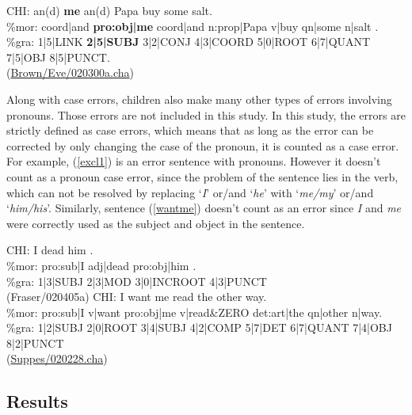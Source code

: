 \begin{exe}
\ex \label{conjoined} \gll *CHI: an(d) \textbf{me} an(d) Papa buy some salt.\\
\%mor: coord|and \textbf{pro:obj|me} coord|and n:prop|Papa v|buy qn|some n|salt .\\
\%gra: 1|5|LINK \textbf{2|5|SUBJ} 3|2|CONJ 4|3|COORD 5|0|ROOT 6|7|QUANT 7|5|OBJ 8|5|PUNCT.\\
(\href{https://childes.talkbank.org/browser/index.php?url=Eng-NA/Brown/Eve/020300a.cha}{Brown/Eve/020300a.cha})
\end{exe}
Along with case errors, children also make many other types of errors involving pronouns. Those errors are not included in this study. In this study, the errors are strictly defined as case errors, which means that as long as the error can be corrected by only changing the case of the pronoun, it is counted as a case error. For example, (\ref{excl1}) is an error sentence with pronouns. However it doesn't count as a pronoun case error, since the problem of the sentence lies in the verb, which can not be resolved by replacing `\textit{I}' or/and `\textit{he}' with `\textit{me/my}' or/and `\textit{him/his}'. Similarly, sentence (\ref{wantme}) doesn't count as an error since \textit{I} and \textit{me} were correctly used as the subject and object in the sentence. 
\begin{exe}
\ex \label{excl1} \gll *CHI:	I dead him .\\
\%mor:	pro:sub|I adj|dead pro:obj|him .\\
\%gra:	1|3|SUBJ 2|3|MOD 3|0|INCROOT 4|3|PUNCT\\ 
(Fraser/020405a)
\ex \label{wantme} \gll *CHI: I want me read the other way. \\
\%mor: pro:sub|I v|want pro:obj|me v|read&ZERO det:art|the qn|other n|way.\\
\%gra: 1|2|SUBJ 2|0|ROOT 3|4|SUBJ 4|2|COMP 5|7|DET 6|7|QUANT 7|4|OBJ 8|2|PUNCT\\
(\href{https://childes.talkbank.org/browser/index.php?url=Eng-NA/Suppes/020228.cha}{Suppes/020228.cha})
\end{exe}

\subsection{Results}
